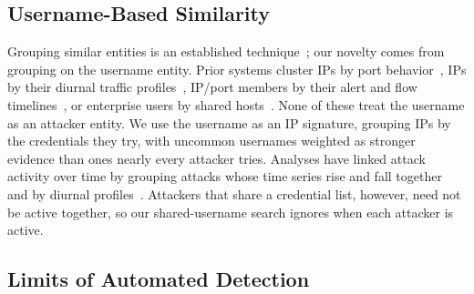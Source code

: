 \documentclass[conference]{IEEEtran}
\begin{document}
\subsection{Username-Based Similarity}
Grouping similar entities is an established technique~\cite{goodall2018situ, liao2012intelligent, pike2008putting, hao2015ensemble};
our novelty comes from grouping on the username entity. Prior systems cluster IPs by port behavior~\cite{goodall2018situ}, 
IPs by their diurnal traffic profiles~\cite{pike2008putting}, IP/port members by their alert and flow timelines~\cite{hao2015ensemble}, or enterprise users
by shared hosts~\cite{liao2012intelligent}. None of these treat the username as an attacker entity.
We use the username as an IP signature, grouping IPs by the credentials they try, with uncommon usernames weighted as stronger evidence than
ones nearly every attacker tries. Analyses have linked attack activity over time by
grouping attacks whose time series rise and fall
together~\cite{pouget2006time,thonnard2008framework} and by diurnal profiles~\cite{pike2008putting}. Attackers
that share a credential list, however, need not be active
together, so our shared-username search ignores when each attacker is 
active.

\subsection{Limits of Automated Detection}
\end{document}

